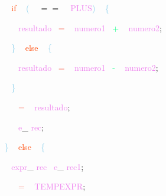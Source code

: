 \documentclass[8, usernames, dvipsnames]{beamer}
\begin{document}
\begin{frame}
\textcolor{White}{\   }
\textcolor{White}{\   }
\textcolor{OrangeRed}{if}
\textcolor{White}{\ }
\textcolor{SkyBlue}{(}
\textcolor{White}{\ }
\textcolor{OliveGreen}{$==$}
\textcolor{White}{\ }
\textcolor{Violet}{PLUS}\textcolor{SkyBlue}{)}
\textcolor{White}{\ }
\textcolor{SkyBlue}{\{ }

 \textcolor{White}{\   }
\textcolor{White}{\   }
\textcolor{White}{\   }
\textcolor{Violet}{resultado}\textcolor{White}{\ }
\textcolor{Salmon}{=}
\textcolor{White}{\ }
\textcolor{Violet}{numero1}\textcolor{White}{\ }
\textcolor{SpringGreen}{+}
\textcolor{White}{\ }
\textcolor{Violet}{numero2}\textcolor{Sepia}{;}

 \textcolor{White}{\   }
\textcolor{White}{\   }
\textcolor{SkyBlue}{\} }
\textcolor{White}{\ }
\textcolor{OrangeRed}{else}
\textcolor{White}{\ }
\textcolor{SkyBlue}{\{ }

 \textcolor{White}{\   }
\textcolor{White}{\   }
\textcolor{White}{\   }
\textcolor{Violet}{resultado}\textcolor{White}{\ }
\textcolor{Salmon}{=}
\textcolor{White}{\ }
\textcolor{Violet}{numero1}\textcolor{White}{\ }
\textcolor{SpringGreen}{-}
\textcolor{White}{\ }
\textcolor{Violet}{numero2}\textcolor{Sepia}{;}

 \textcolor{White}{\   }
\textcolor{White}{\   }
\textcolor{SkyBlue}{\} }

 \textcolor{White}{\   }
\textcolor{White}{\   }
\textcolor{White}{\ }
\textcolor{Salmon}{=}
\textcolor{White}{\ }
\textcolor{Violet}{resultado}\textcolor{Sepia}{;}

 \textcolor{White}{\   }
\textcolor{White}{\   }
\textcolor{OrangeRed}{	}
\textcolor{White}{\ }
\textcolor{Violet}{e}\textcolor{Sepia}{\_}
\textcolor{Violet}{rec}\textcolor{Sepia}{;}

 \textcolor{White}{\   }
\textcolor{SkyBlue}{\} }
\textcolor{White}{\ }
\textcolor{OrangeRed}{else}
\textcolor{White}{\ }
\textcolor{SkyBlue}{\{ }

 \textcolor{White}{\   }
\textcolor{White}{\   }
\textcolor{Violet}{expr}\textcolor{Sepia}{\_}
\textcolor{Violet}{rec}\textcolor{White}{\ }
\textcolor{Violet}{e}\textcolor{Sepia}{\_}
\textcolor{Violet}{rec1}\textcolor{Sepia}{;}

 \textcolor{White}{\   }
\textcolor{White}{\   }
\textcolor{White}{\ }
\textcolor{Salmon}{=}
\textcolor{White}{\ }
\textcolor{Violet}{TEMPEXPR}\textcolor{Sepia}{;}

 \end{frame}
\end{document}
